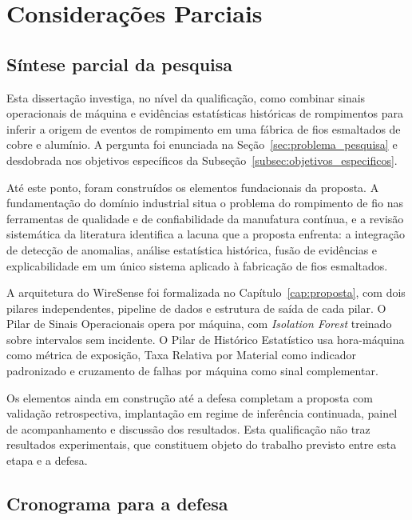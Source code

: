 \chapter{Considerações Parciais}
\label{cap:consideracoes_parciais}


\section{Síntese parcial da pesquisa}
\label{sec:sintese_parcial}

Esta dissertação investiga, no nível da qualificação, como combinar sinais operacionais de máquina e evidências estatísticas históricas de rompimentos para inferir a origem de eventos de rompimento em uma fábrica de fios esmaltados de cobre e alumínio. A pergunta foi enunciada na Seção~\ref{sec:problema_pesquisa} e desdobrada nos objetivos específicos da Subseção~\ref{subsec:objetivos_especificos}.

Até este ponto, foram construídos os elementos fundacionais da proposta. A fundamentação do domínio industrial situa o problema do rompimento de fio nas ferramentas de qualidade e de confiabilidade da manufatura contínua, e a revisão sistemática da literatura identifica a lacuna que a proposta enfrenta: a integração de detecção de anomalias, análise estatística histórica, fusão de evidências e explicabilidade em um único sistema aplicado à fabricação de fios esmaltados.

A arquitetura do WireSense foi formalizada no Capítulo~\ref{cap:proposta}, com dois pilares independentes, pipeline de dados e estrutura de saída de cada pilar. O Pilar de Sinais Operacionais opera por máquina, com \emph{Isolation Forest} treinado sobre intervalos sem incidente. O Pilar de Histórico Estatístico usa hora-máquina como métrica de exposição, Taxa Relativa por Material como indicador padronizado e cruzamento de falhas por máquina como sinal complementar.

Os elementos ainda em construção até a defesa completam a proposta com validação retrospectiva, implantação em regime de inferência continuada, painel de acompanhamento e discussão dos resultados. Esta qualificação não traz resultados experimentais, que constituem objeto do trabalho previsto entre esta etapa e a defesa.


\section{Cronograma para a defesa}
\label{sec:cronograma}


